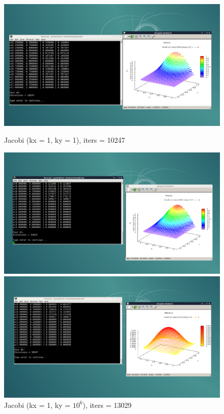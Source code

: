 \documentclass[a4paper, fleqn]{report}
\begin{document}
\begin{figure}[h]
\begin{minipage}{0.49\textwidth}
        \centering
        \includegraphics[width=\textwidth]{media/jacobi_1_1.png}
        \caption{Jacobi (kx = 1, ky = 1), iters = 10247}
    \end{minipage}%
    \begin{minipage}{0.49\textwidth}
        \centering
        \includegraphics[width=\textwidth]{media/jacobi_1_1000000.png}
        \caption{Jacobi (kx = 1, ky = $10^6$), iters = 13029}
    \end{minipage}
    \par\bigskip
    \begin{minipage}{0.49\textwidth}
        \centering
        \includegraphics[width=\textwidth]{media/dif_jacobi_1_1.png}

\end{minipage}
\end{figure}
\end{document}

